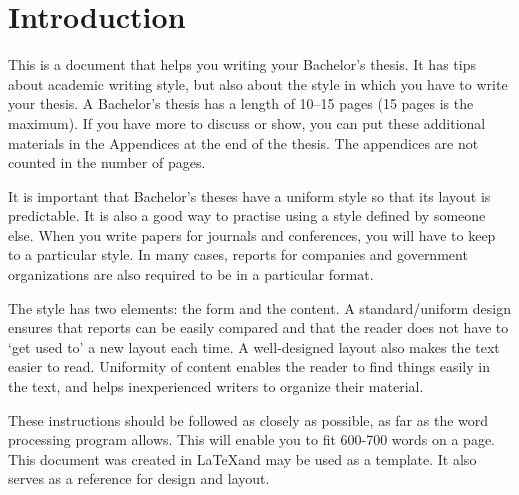 
\section{Introduction}\label{sec:introduction}
This is a document that helps you writing your Bachelor’s thesis.
It has tips about academic writing style, but also about the style in which you have to write your thesis.
A Bachelor’s thesis has a length of 10–15 pages (15 pages is the maximum).
If you have more to discuss or show, you can put these additional materials in the Appendices at the end of the thesis.
The appendices are not counted in the number of pages.

It is important that Bachelor’s theses have a uniform style so that its layout is predictable.
It is also a good way to practise using a style defined by someone else.
When you write papers for journals and conferences, you will have to keep to a particular style.
In many cases, reports for companies and government organizations are also required to be in a particular format.

The style has two elements: the form and the content.
A standard/uniform design ensures that reports can be easily compared and that the reader does not have to ‘get used to’ a new layout each time.
A well-designed layout also makes the text easier to read.
Uniformity of content enables the reader to find things easily in the text, and helps inexperienced writers to organize their material.

These instructions should be followed as closely as possible, as far as the word processing program allows.
This will enable you to fit 600-700 words on a page.
This document was created in \LaTeX and may be used as a template.
It also serves as a reference for design and layout.
